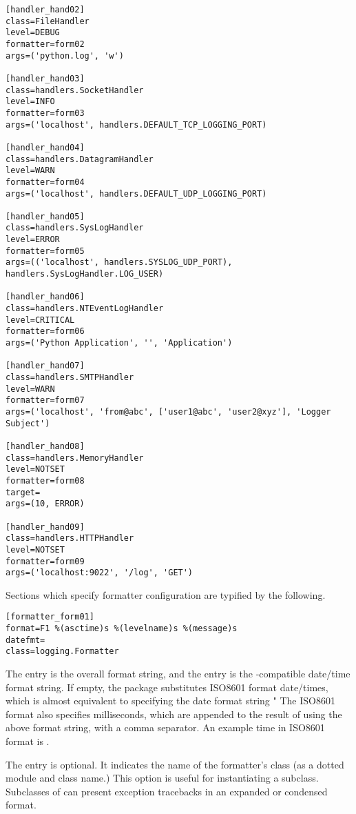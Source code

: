 \begin{verbatim}
[handler_hand02]
class=FileHandler
level=DEBUG
formatter=form02
args=('python.log', 'w')

[handler_hand03]
class=handlers.SocketHandler
level=INFO
formatter=form03
args=('localhost', handlers.DEFAULT_TCP_LOGGING_PORT)

[handler_hand04]
class=handlers.DatagramHandler
level=WARN
formatter=form04
args=('localhost', handlers.DEFAULT_UDP_LOGGING_PORT)

[handler_hand05]
class=handlers.SysLogHandler
level=ERROR
formatter=form05
args=(('localhost', handlers.SYSLOG_UDP_PORT), handlers.SysLogHandler.LOG_USER)

[handler_hand06]
class=handlers.NTEventLogHandler
level=CRITICAL
formatter=form06
args=('Python Application', '', 'Application')

[handler_hand07]
class=handlers.SMTPHandler
level=WARN
formatter=form07
args=('localhost', 'from@abc', ['user1@abc', 'user2@xyz'], 'Logger Subject')

[handler_hand08]
class=handlers.MemoryHandler
level=NOTSET
formatter=form08
target=
args=(10, ERROR)

[handler_hand09]
class=handlers.HTTPHandler
level=NOTSET
formatter=form09
args=('localhost:9022', '/log', 'GET')
\end{verbatim}

Sections which specify formatter configuration are typified by the following.

\begin{verbatim}
[formatter_form01]
format=F1 %(asctime)s %(levelname)s %(message)s
datefmt=
class=logging.Formatter
\end{verbatim}

The  entry is the overall format string, and the
 entry is the -compatible date/time format
string. If empty, the package substitutes ISO8601 format date/times, which
is almost equivalent to specifying the date format string "%
The ISO8601 format also specifies milliseconds, which are appended to the
result of using the above format string, with a comma separator. An example
time in ISO8601 format is .

The  entry is optional.  It indicates the name of the
formatter's class (as a dotted module and class name.)  This option is
useful for instantiating a  subclass.  Subclasses of
 can present exception tracebacks in an expanded or
condensed format.
